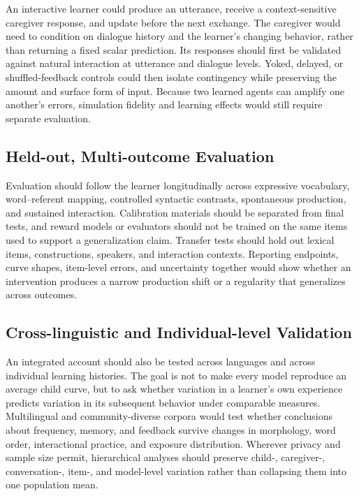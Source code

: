 An interactive learner could produce an utterance, receive a context-sensitive caregiver response, and update before the next exchange. The caregiver would need to condition on dialogue history and the learner's changing behavior, rather than returning a fixed scalar prediction. Its responses should first be validated against natural interaction at utterance and dialogue levels. Yoked, delayed, or shuffled-feedback controls could then isolate contingency while preserving the amount and surface form of input. Because two learned agents can amplify one another's errors, simulation fidelity and learning effects would still require separate evaluation.

\subsection{Held-out, Multi-outcome Evaluation}

Evaluation should follow the learner longitudinally across expressive vocabulary, word--referent mapping, controlled syntactic contrasts, spontaneous production, and sustained interaction. Calibration materials should be separated from final tests, and reward models or evaluators should not be trained on the same items used to support a generalization claim. Transfer tests should hold out lexical items, constructions, speakers, and interaction contexts. Reporting endpoints, curve shapes, item-level errors, and uncertainty together would show whether an intervention produces a narrow production shift or a regularity that generalizes across outcomes.

\subsection{Cross-linguistic and Individual-level Validation}

An integrated account should also be tested across languages and across individual learning histories. The goal is not to make every model reproduce an average child curve, but to ask whether variation in a learner's own experience predicts variation in its subsequent behavior under comparable measures. Multilingual and community-diverse corpora would test whether conclusions about frequency, memory, and feedback survive changes in morphology, word order, interactional practice, and exposure distribution. Wherever privacy and sample size permit, hierarchical analyses should preserve child-, caregiver-, conversation-, item-, and model-level variation rather than collapsing them into one population mean.

